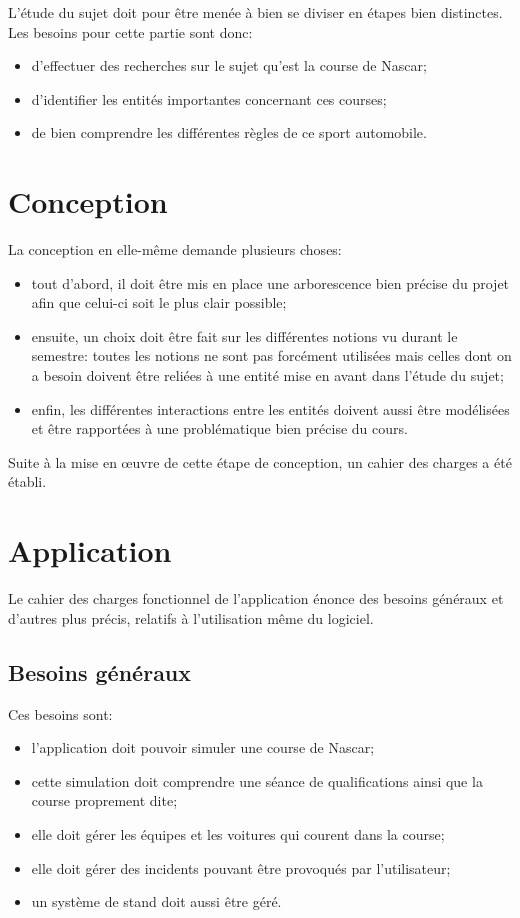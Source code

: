 \documentclass[a4paper, 11pt]{report}
\begin{document}
		L'étude du sujet doit pour être menée à bien se diviser en étapes bien distinctes. Les besoins pour cette partie sont donc:
		\begin{itemize}
			\item d'effectuer des recherches sur le sujet qu'est la course de Nascar;
			\item d'identifier les entités importantes concernant ces courses;
			\item de bien comprendre les différentes règles de ce sport automobile.
		\end{itemize}
		
		\section{Conception}
		
		La conception en elle-même demande plusieurs choses:
		\begin{itemize}
			\item tout d'abord, il doit être mis en place une arborescence bien précise du projet afin que celui-ci soit le plus clair possible;
			\item ensuite, un choix doit être fait sur les différentes notions vu durant le semestre: toutes les notions ne sont pas forcément utilisées mais celles dont on a besoin doivent être reliées à une entité mise en avant dans l'étude du sujet;
			\item enfin, les différentes interactions entre les entités doivent aussi être modélisées et être rapportées à une problématique bien précise du cours. \\
		\end{itemize}
		
		Suite à la mise en œuvre de cette étape de conception, un cahier des charges a été établi.
		
		\section{Application}
		
		Le cahier des charges fonctionnel de l'application énonce des besoins généraux et d'autres plus précis, relatifs à l'utilisation même du logiciel.
		
			\subsection{Besoins généraux}
			
			Ces besoins sont:
			\begin{itemize}
				\item l'application doit pouvoir simuler une course de Nascar; 
				\item cette simulation doit comprendre une séance de qualifications ainsi que la course proprement dite;
				\item elle doit gérer les équipes et les voitures qui courent dans la course;
				\item elle doit gérer des incidents pouvant être provoqués par l'utilisateur;
				\item un système de stand doit aussi être géré.
			\end{itemize}
			
\end{document}
